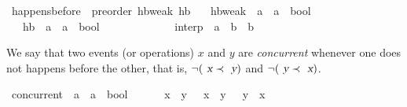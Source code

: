 \documentclass[acmlarge,review,anonymous]{acmart}\settopmatter{printfolios=true}
\begin{document}
\begin{isabellebody}
  \isanewline
{}\isamarkupfalse%
\ happens{\isacharunderscore}before\ {\isacharequal}\ preorder\ hb{\isacharunderscore}weak\ hb\isanewline
\ \ \ hb{\isacharunderscore}weak\ {\isacharcolon}{\isacharcolon}\ {\isachardoublequoteopen}{\isacharprime}a\ {\isasymRightarrow}\ {\isacharprime}a\ {\isasymRightarrow}\ bool{\isachardoublequoteclose}\ \ {\isacharparenleft}\ {\isachardoublequoteopen}{\isasympreceq}{\isachardoublequoteclose}\ {}{}{\isacharparenright}\isanewline
\ \ \ hb\ {\isacharcolon}{\isacharcolon}\ {\isachardoublequoteopen}{\isacharprime}a\ {\isasymRightarrow}\ {\isacharprime}a\ {\isasymRightarrow}\ bool{\isachardoublequoteclose}\ \ \ \ \ \ \ {\isacharparenleft}\ {\isachardoublequoteopen}{\isasymprec}{\isachardoublequoteclose}\ {}{}{\isacharparenright}\ {\isacharplus}\isanewline
\ \ \ interp\ {\isacharcolon}{\isacharcolon}\ {\isachardoublequoteopen}{\isacharprime}a\ {\isasymRightarrow}\ {\isacharprime}b\ {\isasymrightharpoonup}\ {\isacharprime}b{\isachardoublequoteclose}\ {\isacharparenleft}{\isachardoublequoteopen}{\isasymlangle}{\isacharunderscore}{\isasymrangle}{\isachardoublequoteclose}\ {\isacharbrackleft}{}{\isacharbrackright}\ {}{}{}{}{\isacharparenright}\isanewline
\end{isabellebody}

We say that two events (or operations) $x$ and $y$ are \emph{concurrent}
whenever one does not happens before the other, that is, $\neg (\isa{x} \prec
\isa{y})$ and $\neg (\isa{y} \prec \isa{x})$.

\begin{isabellebody}
  \isanewline
{}\isamarkupfalse%
\ concurrent\ {\isacharcolon}{\isacharcolon}\ {\isachardoublequoteopen}{\isacharprime}a\ {\isasymRightarrow}\ {\isacharprime}a\ {\isasymRightarrow}\ bool{\isachardoublequoteclose}\ {\isacharparenleft}\ {\isachardoublequoteopen}{\isasymparallel}{\isachardoublequoteclose}\ {}{}{\isacharparenright}\ \isanewline
\ \ {\isachardoublequoteopen}x\ {\isasymparallel}\ y\ {\isasymequiv}\ {\isasymnot}\ {\isacharparenleft}x\ {\isasymprec}\ y{\isacharparenright}\ {\isasymand}\ {\isasymnot}\ {\isacharparenleft}y\ {\isasymprec}\ x{\isacharparenright}{\isachardoublequoteclose}\isanewline
\end{isabellebody}
\end{document}
